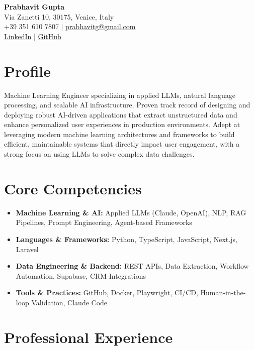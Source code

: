 \documentclass[11pt, a4paper]{article}
\begin{document}
\begin{center}
    {\Huge \textbf{Prabhavit Gupta}} \\ \vspace{4pt}
    Via Zanetti 10, 30175, Venice, Italy \\
    +39 351 610 7807 | \href{mailto:prabhavitg@gmail.com}{prabhavitg@gmail.com} \\
    \href{https://www.linkedin.com/in/prabhavit/}{LinkedIn} | \href{https://github.com/prab-gupta}{GitHub}
\end{center}

\section*{Profile}
Machine Learning Engineer specializing in applied LLMs, natural language processing, and scalable AI infrastructure. Proven track record of designing and deploying robust AI-driven applications that extract unstructured data and enhance personalized user experiences in production environments. Adept at leveraging modern machine learning architectures and frameworks to build efficient, maintainable systems that directly impact user engagement, with a strong focus on using LLMs to solve complex data challenges.

\section*{Core Competencies}
\begin{itemize}[leftmargin=1.5em, itemsep=2pt]
    \item \textbf{Machine Learning \& AI:} Applied LLMs (Claude, OpenAI), NLP, RAG Pipelines, Prompt Engineering, Agent-based Frameworks
    \item \textbf{Languages \& Frameworks:} Python, TypeScript, JavaScript, Next.js, Laravel
    \item \textbf{Data Engineering \& Backend:} REST APIs, Data Extraction, Workflow Automation, Supabase, CRM Integrations
    \item \textbf{Tools \& Practices:} GitHub, Docker, Playwright, CI/CD, Human-in-the-loop Validation, Claude Code
\end{itemize}

\section*{Professional Experience}
\end{document}
